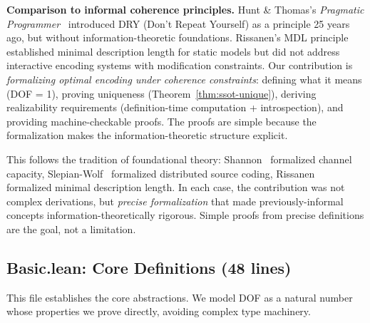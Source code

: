 \textbf{Comparison to informal coherence principles.} Hunt \& Thomas's \textit{Pragmatic Programmer}~\cite{hunt1999pragmatic} introduced DRY (Don't Repeat Yourself) as a principle 25 years ago, but without information-theoretic foundations. Rissanen's MDL principle~\cite{rissanen1978mdl} established minimal description length for static models but did not address interactive encoding systems with modification constraints. Our contribution is \emph{formalizing optimal encoding under coherence constraints}: defining what it means (DOF = 1), proving uniqueness (Theorem~\ref{thm:ssot-unique}), deriving realizability requirements (definition-time computation + introspection), and providing machine-checkable proofs. The proofs are simple because the formalization makes the information-theoretic structure explicit.

This follows the tradition of foundational theory: Shannon~\cite{shannon1948mathematical} formalized channel capacity, Slepian-Wolf~\cite{slepian1973noiseless} formalized distributed source coding, Rissanen~\cite{rissanen1978mdl} formalized minimal description length. In each case, the contribution was not complex derivations, but \emph{precise formalization} that made previously-informal concepts information-theoretically rigorous. Simple proofs from precise definitions are the goal, not a limitation.

\subsection*{Basic.lean: Core Definitions (48 lines)}\label{sec:lean-basic}

This file establishes the core abstractions. We model DOF as a natural number whose properties we prove directly, avoiding complex type machinery.

